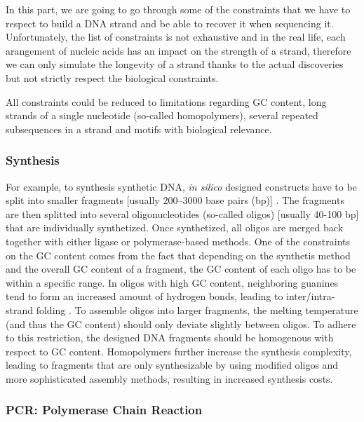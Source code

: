 In this part, we are going to go through some of the constraints that we have to respect to build a DNA strand and be able to recover it when sequencing it. Unfortunately, the list of constraints is not exhaustive and in the real life, each arangement of nucleic acids has an impact on the strength of a strand, therefore we can only simulate the longevity of a strand thanks to the actual discoveries but not strictly respect the biological constraints. 

All constraints could be reduced to limitations regarding GC content, long strands of a single nucleotide (so-called homopolymers), several repeated subsequences in a strand and motifs with biological relevance. 

\subsubsection{Synthesis}

For example, to synthesis synthetic DNA, \textit{in silico} designed constructs have to be split into smaller fragments [usually 200–3000 base pairs (bp)] \cite{bib:101038}. The fragments are then splitted into several oligonucleotides (so-called oligos) [usually 40-100 bp] that are individually synthetized. Once synthetized, all oligos are merged back together with either ligase or polymerase-based methods. One of the constraints on the GC content comes from the fact that depending on the synthetis method and the overall GC content of a fragment,  the GC content of each oligo has to be within a specific range. In oligos with high GC content, neighboring guanines tend to form an increased amount of hydrogen bonds, leading to inter/intra-strand folding \cite{bib:101371}.
To assemble oligos into larger fragments, the melting temperature (and thus the GC content) should only deviate slightly between oligos. To adhere to this restriction, the designed DNA fragments should be homogenous with respect to GC content. Homopolymers further increase the synthesis complexity, leading to fragments that are only synthesizable by using modified oligos and more sophisticated assembly methods, resulting in increased synthesis costs.

\subsubsection{PCR: Polymerase Chain Reaction}

